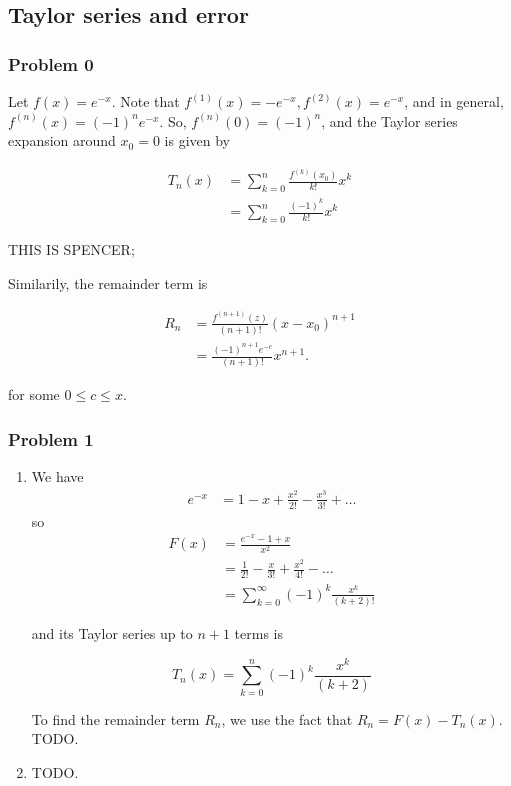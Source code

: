 \documentclass[letter,11pt]{article}
\begin{document}
\subsection*{Taylor series and error}
\subsubsection*{Problem 0}
Let $f(x) = e^{-x}$. Note that $f^{(1)}(x) = -e^{-x}, f^{(2)}(x) = e^{-x}$, and in general, $f^{(n)}(x) = (-1)^ne^{-x}$. So, $f^{(n)}(0) = (-1)^n$, and the Taylor series expansion around $x_0 = 0$ is given by

\begin{align*}
T_n(x) &= \sum_{k = 0}^n \frac{f^{(k)}(x_0)}{k!} x^k \\
&= \sum_{k = 0}^n \frac{(-1)^k}{k!}x^k
\end{align*}

THIS IS SPENCER;

Similarily, the remainder term is

\begin{align*}
R_n &= \frac{f^{(n + 1)}(z)}{(n + 1)!}(x - x_0)^{n + 1} \\
&= \frac{(-1)^{n + 1} e^{-c}}{(n + 1)!}x^{n + 1}.
\end{align*}

for some $0 \leq c \leq x$.

\subsubsection*{Problem 1}
\begin{enumerate}[label=\alph*.]
  \item We have \begin{align*}
    e^{-x} &= 1 - x + \frac{x^2}{2!} - \frac{x^3}{3!} + \dots
  \end{align*}
  so
  \begin{align*}
    F(x) &= \frac{e^{-x} - 1 + x}{x^2} \\
    &= \frac{1}{2!} - \frac{x}{3!} + \frac{x^2}{4!} - \dots \\
    &= \sum_{k = 0}^\infty (-1)^k \frac{x^k}{(k + 2)!}
  \end{align*}

  and its Taylor series up to $n + 1$ terms is

  $$
  T_n(x) = \sum_{k = 0}^n (-1)^k \frac{x^k}{(k + 2)}
  $$

  To find the remainder term $R_n$, we use the fact that $R_n = F(x) - T_n(x)$. TODO.
  \item TODO.
\end{enumerate}
\end{document}
